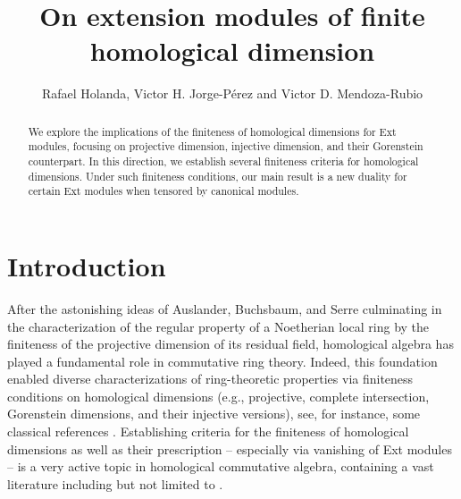\documentclass[11pt, a4paper,pagebackref]{amsart}
\author[Holanda,  Jorge-P\'erez, Mendoza-Rubio]{Rafael Holanda, Victor H. Jorge-P\'erez and Victor D. Mendoza-Rubio}
\numberwithin{equation}{section}
\theoremstyle{definition}
\newtheorem{remark and definition}[theorem]{Remark and Definition}
\newtheorem{remark and notation}[theorem]{Remark and Notation}
\begin{document}
\title{On extension modules of finite homological dimension}

\maketitle

\begin{abstract}
We explore the implications of the finiteness of homological dimensions for Ext modules, focusing on projective dimension, injective dimension, and their Gorenstein counterpart. In this direction, we establish several finiteness criteria for homological dimensions. Under such finiteness conditions, our main result is a new duality for certain Ext modules when tensored by canonical modules. 
\end{abstract}

\section{Introduction}


After the astonishing ideas of Auslander, Buchsbaum, and Serre culminating in the characterization of the regular property of a Noetherian local ring by the finiteness of the projective dimension of its residual field, homological algebra has played a fundamental role in commutative ring theory.  Indeed, this foundation enabled diverse characterizations of ring-theoretic properties via finiteness conditions on homological dimensions (e.g., projective, complete intersection, Gorenstein dimensions, and their injective versions), see, for instance, some classical references \cite{Stablemoduletheory, Completeintersectiondimension, GorensteinDimensions, isomorphismsbetweencomplexeswithapplicationstothehomologicaltheoryofmodules, Dimensionprojectivefinietcohomologielocale}. Establishing criteria for the finiteness of homological dimensions as well as their prescription -- especially via vanishing of Ext modules -- is a very active topic in homological commutative algebra, containing a vast literature including but not limited to 
\cite{Stablemoduletheory, HomologicalDimensionsAndRelatedInvariantsOfModulesOverLocalRings, GorensteinDimensions,  OnGorensteinProjectiveInjectiveAndFlatDimensionsAFunctorialDescriptionWithApplications, HomologicalDimensionsTheGorensteinPropertyAndSpecialCasesOfSomeConjectures, FH, GorensteinringsviahomologicaldimensionsandsymmetryinvanishingofExtandTatecohomology, ARCForModulesWhose(Self)DualHasFiniteCompleteIntersectionDimensionv2, VanishingOf(Co)homologyfrenessCriteriaAndTheAuslanderReitenConjectureforCohen-MacaulayBurch, GdimensionOverLocalHomomorphisms, AuslanderReitenCinjetivadimensionVanishingofExt, OnModulesWhoseDualIsOfFiniteGorensteinDimension, GorensteinDimensionAndTorsionOfModulesOverCommutativeNoetherianRings, NumericalApectsofComplexesOfFiniteHomologicalDimensions,HomologicalDimensionsOfRigidModules}. 
\end{document}
